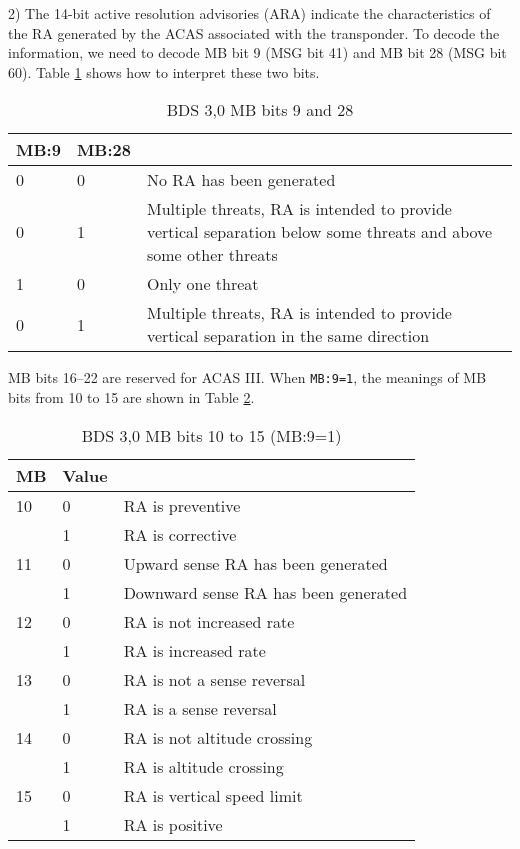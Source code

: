 2) The 14-bit active resolution advisories (ARA) indicate the characteristics of the RA generated by the ACAS associated with the transponder. To decode the information, we need to decode MB bit 9 (MSG bit 41) and MB bit 28 (MSG bit 60). Table \ref{tb:bds30_mb9_mb28} shows how to interpret these two bits.

\begin{table}[ht]
\centering
\caption{BDS 3,0 MB bits 9 and 28}
\label{tb:bds30_mb9_mb28}
\begin{tabular}{|l|l|p{7cm}|}
\hline
\textbf{MB:9} & \textbf{MB:28} & \textbf{} \\ \hline
0 & 0 & No RA has been generated \\ \hline
0 & 1 & Multiple threats, RA is intended to provide vertical separation below some threats and above some other threats \\ \hline
1 & 0 & Only one threat \\ \hline
0 & 1 & Multiple threats, RA is intended to provide vertical separation in the same direction \\ \hline
\end{tabular}
\end{table}

MB bits 16--22 are reserved for ACAS III. When \texttt{MB:9=1}, the meanings of MB bits from 10 to 15 are shown in Table \ref{tb:bds30_mb10-22_1}.

\begin{table}[]
\centering
\caption{BDS 3,0 MB bits 10 to 15 (MB:9=1)}
\label{tb:bds30_mb10-22_1}
\begin{tabular}{|l|l|l|}
\hline
\textbf{MB} & \textbf{Value} & \textbf{} \\ \hline
10 & 0 & RA is preventive \\ \hline
 & 1 & RA is corrective \\ \hline
11 & 0 & Upward sense RA has been generated \\ \hline
 & 1 & Downward sense RA has been generated \\ \hline
12 & 0 & RA is not increased rate \\ \hline
 & 1 & RA is increased rate \\ \hline
13 & 0 & RA is not a sense reversal \\ \hline
 & 1 & RA is a sense reversal \\ \hline
14 & 0 & RA is not altitude crossing \\ \hline
 & 1 & RA is altitude crossing \\ \hline
15 & 0 & RA is vertical speed limit \\ \hline
 & 1 & RA is positive \\ \hline
\end{tabular}
\end{table}


